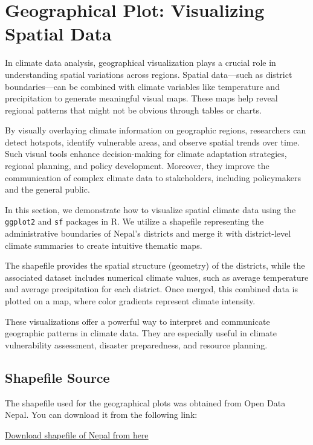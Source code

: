 \section{Geographical Plot: Visualizing Spatial Data}

In climate data analysis, geographical visualization plays a crucial role in understanding spatial variations across regions. Spatial data—such as district boundaries—can be combined with climate variables like temperature and precipitation to generate meaningful visual maps. These maps help reveal regional patterns that might not be obvious through tables or charts.

By visually overlaying climate information on geographic regions, researchers can detect hotspots, identify vulnerable areas, and observe spatial trends over time. Such visual tools enhance decision-making for climate adaptation strategies, regional planning, and policy development. Moreover, they improve the communication of complex climate data to stakeholders, including policymakers and the general public.

In this section, we demonstrate how to visualize spatial climate data using the \texttt{ggplot2} and \texttt{sf} packages in R. We utilize a shapefile representing the administrative boundaries of Nepal’s districts and merge it with district-level climate summaries to create intuitive thematic maps.

The shapefile provides the spatial structure (geometry) of the districts, while the associated dataset includes numerical climate values, such as average temperature and average precipitation for each district. Once merged, this combined data is plotted on a map, where color gradients represent climate intensity.

These visualizations offer a powerful way to interpret and communicate geographic patterns in climate data. They are especially useful in climate vulnerability assessment, disaster preparedness, and resource planning.

\subsection*{Shapefile Source}

The shapefile used for the geographical plots was obtained from Open Data Nepal. You can download it from the following link:

\href{https://opendatanepal.com/dataset/new-political-and-administrative-boundaries-shapefile-of-nepal}{Download shapefile of Nepal from here}


